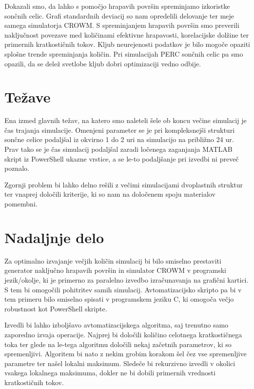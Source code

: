 \documentclass[a4paper,twoside,openright,12pt,slovene]{book}
\begin{document}
 Dokazali smo, da lahko s pomočjo hrapavih površin spreminjamo izkoristke sončnih celic. Grafi standardnih deviacij so nam opredelili delovanje ter meje samega simulatorja CROWM. S spreminjanjem hrapavih površin smo preverili naključnost povezave med količinami efektivne hrapavosti, korelacijske dolžine ter primernih kratkostičnih tokov. Kljub neurejenosti podatkov je bilo mogoče opaziti splošne trende spreminjanja količin. Pri simulacijah PERC sončnih celic pa smo opazili, da se delež svetlobe kljub dobri optimizaciji vedno odbije.

\section{Težave}

Ena izmed glavnih težav, na katero smo naleteli šele ob koncu večine simulacij je čas trajanja simulacije. Omenjeni parameter se je pri kompleksnejši strukturi sončne celice podaljšal iz okvirno 1 do 2 uri na simulacijo na približno 24 ur. Prav tako se je čas simulacij podaljšal zaradi ločenega zaganjanja MATLAB skript iz PowerShell ukazne vrstice, a se le-to podaljšanje pri izvedbi ni preveč poznalo.

Zgornji problem bi lahko delno rešili z večimi simulacijami dvoplastnih struktur ter vnaprej določili kriterije, ki so nam na določenem spoju materialov pomembni.


\section{Nadaljnje delo}

Za optimalno izvajanje večjih količin simulacij bi bilo smiselno prestaviti generator naključno hrapavih površin in simulator CROWM v programski jezik/okolje, ki je primerno za paralelno izvedbo izračunavanja na grafični kartici. S tem bi omogočili pohitritev samih simulacij. Avtomatizacijsko skripto pa bi v tem primeru bilo smiselno spisati v programskem jeziku C, ki omogoča večjo robustnost kot PowerShell skripte.

Izvedli bi lahko izboljšavo avtomatizacijskega algoritma, saj trenutno samo zaporedno izvaja operacije. Najprej bi določili količino celotnega kratkostičnega toka ter glede na le-tega algoritmu določili nekaj začetnih parametrov, ki so spremenljivi. Algoritem bi nato z nekim grobim korakom šel čez vse spremenljive parametre ter našel lokalni maksimum. Sledeče bi rekurzivno izvedli v okolici vsakega lokalnega maksimuma, dokler ne bi dobili primernih vrednosti kratkostičnih tokov. \cite{IOPOPSC}


\cleardoublepage{}


\end{document}
